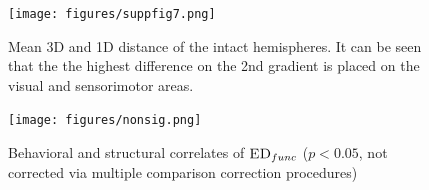 \documentclass[fleqn,10pt]{wlscirep}
\begin{document}

\begin{figure}[]
\centering
\texttt{[image: figures/suppfig7.png]}
\renewcommand{\figurename}{Supplementary Figure}
\caption{\label{fig:intra3D1D} Mean 3D and 1D distance of the intact hemispheres. It can be seen that the
the highest difference on the 2nd gradient is placed on the visual and sensorimotor areas. } 
\end{figure}

\begin{figure}[]
\centering
\texttt{[image: figures/nonsig.png]}
\renewcommand{\figurename}{Supplementary Figure}
\caption{\label{fig:beh_lateral} Behavioral and structural correlates of $\textsc{ED}_{func}$ ($p < 0.05$, not corrected via multiple comparison correction procedures)} 
\end{figure}
\end{document}
